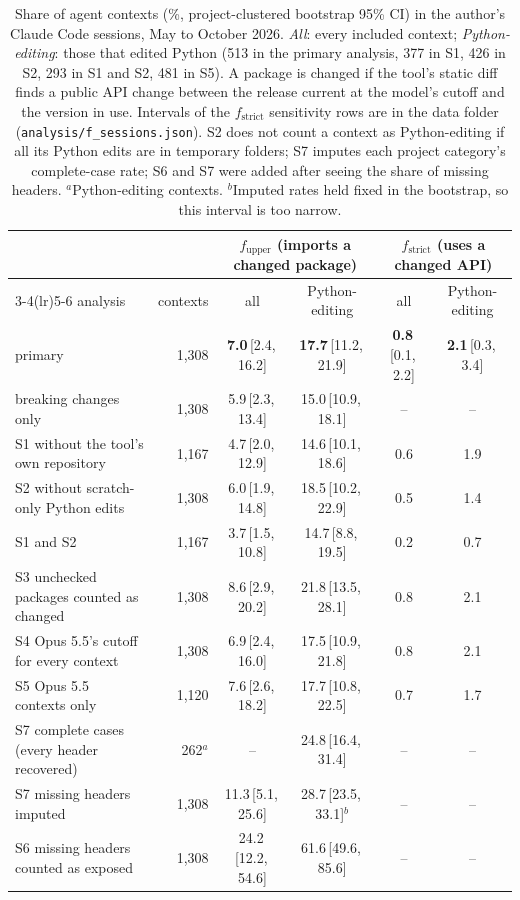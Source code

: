 \documentclass[11pt]{article}
\newcommand{\tci}[2]{\,{\scriptsize[#1,\,#2]}}
\newcommand{\code}[1]{\texttt{#1}}
\begin{document}
\begin{table}[t]
\centering
\footnotesize
\setlength{\tabcolsep}{4pt}
\begin{tabular}{lrcccc}
\toprule
 & & \multicolumn{2}{c}{$f_\text{upper}$ (imports a changed package)} & \multicolumn{2}{c}{$f_\text{strict}$ (uses a changed API)} \\
\cmidrule(lr){3-4}\cmidrule(lr){5-6}
analysis & contexts & all & Python-editing & all & Python-editing \\
\midrule
primary & 1,308 & \textbf{7.0}\tci{2.4}{16.2} & \textbf{17.7}\tci{11.2}{21.9} & \textbf{0.8}\tci{0.1}{2.2} & \textbf{2.1}\tci{0.3}{3.4} \\
\quad breaking changes only & 1,308 & 5.9\tci{2.3}{13.4} & 15.0\tci{10.9}{18.1} & -- & -- \\
S1 without the tool's own repository & 1,167 & 4.7\tci{2.0}{12.9} & 14.6\tci{10.1}{18.6} & 0.6 & 1.9 \\
S2 without scratch-only Python edits & 1,308 & 6.0\tci{1.9}{14.8} & 18.5\tci{10.2}{22.9} & 0.5 & 1.4 \\
S1 and S2 & 1,167 & 3.7\tci{1.5}{10.8} & 14.7\tci{8.8}{19.5} & 0.2 & 0.7 \\
S3 unchecked packages counted as changed & 1,308 & 8.6\tci{2.9}{20.2} & 21.8\tci{13.5}{28.1} & 0.8 & 2.1 \\
S4 Opus 5.5's cutoff for every context & 1,308 & 6.9\tci{2.4}{16.0} & 17.5\tci{10.9}{21.8} & 0.8 & 2.1 \\
S5 Opus 5.5 contexts only & 1,120 & 7.6\tci{2.6}{18.2} & 17.7\tci{10.8}{22.5} & 0.7 & 1.7 \\
S7 complete cases (every header recovered) & 262$^{a}$ & -- & 24.8\tci{16.4}{31.4} & -- & -- \\
S7 missing headers imputed & 1,308 & 11.3\tci{5.1}{25.6} & 28.7\tci{23.5}{33.1}$^{b}$ & -- & -- \\
S6 missing headers counted as exposed & 1,308 & 24.2\tci{12.2}{54.6} & 61.6\tci{49.6}{85.6} & -- & -- \\
\bottomrule
\end{tabular}
\caption{Share of agent contexts (\%, project-clustered bootstrap 95\% CI) in the author's Claude Code sessions, May to October 2026. \emph{All}: every included context; \emph{Python-editing}: those that edited Python (513 in the primary analysis, 377 in S1, 426 in S2, 293 in S1 and S2, 481 in S5). A package is changed if the tool's static diff finds a public API change between the release current at the model's cutoff and the version in use. Intervals of the $f_\text{strict}$ sensitivity rows are in the data folder (\code{analysis/f\_sessions.json}). S2 does not count a context as Python-editing if all its Python edits are in temporary folders; S7 imputes each project category's complete-case rate; S6 and S7 were added after seeing the share of missing headers. $^{a}$Python-editing contexts. $^{b}$Imputed rates held fixed in the bootstrap, so this interval is too narrow.}
\label{tab:fsess}
\end{table}
\end{document}
